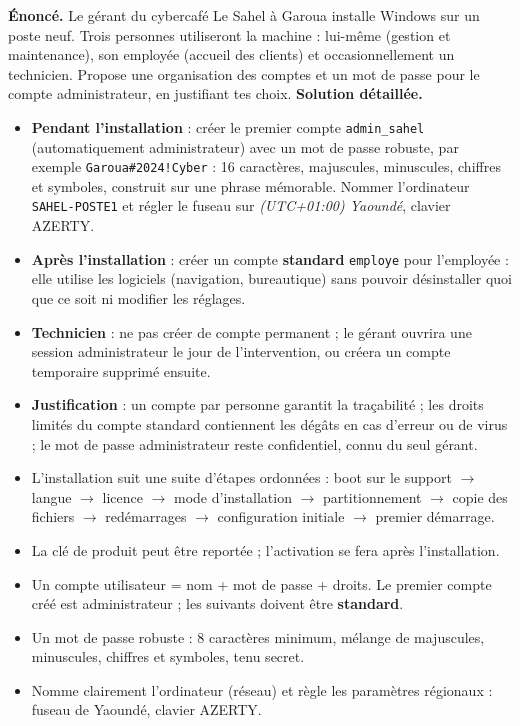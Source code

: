 \documentclass[11pt]{article}
\begin{document}
\begin{exoresolu}
\textbf{Énoncé.} Le gérant du cybercafé \og Le Sahel \fg{} à Garoua installe Windows sur un poste neuf. Trois personnes utiliseront la machine : lui-même (gestion et maintenance), son employée (accueil des clients) et occasionnellement un technicien. Propose une organisation des comptes et un mot de passe pour le compte administrateur, en justifiant tes choix.
\tcblower
\textbf{Solution détaillée.}
\begin{itemize}
  \item \textbf{Pendant l'installation} : créer le premier compte \texttt{admin\_sahel} (automatiquement administrateur) avec un mot de passe robuste, par exemple \texttt{Garoua\#2024!Cyber} : 16 caractères, majuscules, minuscules, chiffres et symboles, construit sur une phrase mémorable. Nommer l'ordinateur \texttt{SAHEL-POSTE1} et régler le fuseau sur \emph{(UTC+01:00) Yaoundé}, clavier AZERTY.
  \item \textbf{Après l'installation} : créer un compte \textbf{standard} \texttt{employe} pour l'employée : elle utilise les logiciels (navigation, bureautique) sans pouvoir désinstaller quoi que ce soit ni modifier les réglages.
  \item \textbf{Technicien} : ne pas créer de compte permanent ; le gérant ouvrira une session administrateur le jour de l'intervention, ou créera un compte temporaire supprimé ensuite.
  \item \textbf{Justification} : un compte par personne garantit la traçabilité ; les droits limités du compte standard contiennent les dégâts en cas d'erreur ou de virus ; le mot de passe administrateur reste confidentiel, connu du seul gérant.
\end{itemize}
\end{exoresolu}

\begin{aretenir}
\begin{itemize}
  \item L'installation suit une suite d'étapes ordonnées : boot sur le support $\rightarrow$ langue $\rightarrow$ licence $\rightarrow$ mode d'installation $\rightarrow$ partitionnement $\rightarrow$ copie des fichiers $\rightarrow$ redémarrages $\rightarrow$ configuration initiale $\rightarrow$ premier démarrage.
  \item La clé de produit peut être reportée ; l'activation se fera après l'installation.
  \item Un compte utilisateur = nom + mot de passe + droits. Le premier compte créé est administrateur ; les suivants doivent être \textbf{standard}.
  \item Un mot de passe robuste : 8 caractères minimum, mélange de majuscules, minuscules, chiffres et symboles, tenu secret.
  \item Nomme clairement l'ordinateur (réseau) et règle les paramètres régionaux : fuseau de Yaoundé, clavier AZERTY.
\end{itemize}
\end{aretenir}
\end{document}
